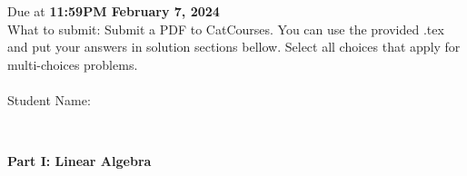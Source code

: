 \documentclass[addpoints,12pt]{exam}
\begin{document}
\noindent Due at \textbf{11:59PM February 7, 2024} \\
\noindent What to submit: Submit a PDF to CatCourses. You can use the provided .tex and put your answers in solution sections bellow. Select all choices that apply for multi-choices problems. \\ \\
\noindent Student Name:
\runningheadrule
{}

\begin{center}
\makebox[\textwidth]{\enspace\hrulefill}\\ 
\end{center}

\noindent\textbf{{\large Part I: Linear Algebra}}
\end{document}
